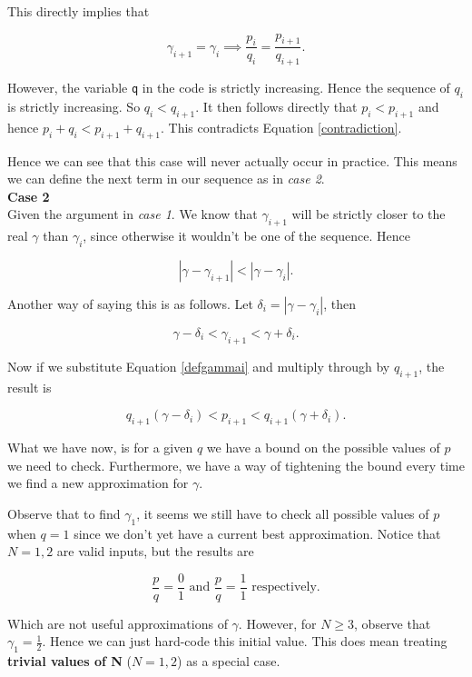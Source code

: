 \documentclass[10pt]{article}
\newcommand*{\gam}{$\gamma$}
\newcommand*{\gami}{$\gamma_{i}$}
\begin{document}
This directly implies that

$$ \gamma_{i+1} = \gamma_{i}  \implies \frac{p_i}{q_i} = \frac{p_{i+1}}{q_{i+1}}.$$

However, the variable \texttt{q} in the code is strictly increasing. Hence the sequence of $q_i$ is strictly increasing. So $q_i < q_{i+1}$. It then follows directly that $p_i < p_{i+1}$ and hence $p_i + q_i < p_{i+1} + q_{i+1}$. This contradicts Equation \ref{contradiction}.

Hence we can see that this case will never actually occur in practice. This means we can define the next term in our sequence as in \emph{case 2}. \\

\noindent \textbf{Case 2} \\

Given the argument in \emph{case 1}. We know that $\gamma_{i+1}$ will be strictly closer to the real $\gamma$ than \gami, since otherwise it wouldn't be one of the sequence. Hence

$$ |\gamma- \gamma_{i+1}| < |\gamma - \gamma_{i}| .$$

Another way of saying this is as follows. Let $\delta_{i} = | \gamma - \gamma_i  |$, then

$$ \gamma - \delta_i < \gamma_{i+1} < \gamma + \delta_i .$$

Now if we substitute Equation \ref{defgammai} and multiply through by $q_{i+1}$, the result is

\begin{equation} \label{em_constraint}
q_{i+1} (\gamma - \delta_i) < p_{i+1} < q_{i+1} ( \gamma + \delta_i ).
\end{equation} 

What we have now, is for a given $q$ we have a bound on the possible values of $p$ we need to check. Furthermore, we have a way of tightening the bound every time we find a new approximation for \gam.

Observe that to find $\gamma_1$, it seems we still have to check all possible values of $p$ when $q = 1$ since we don't yet have a current best approximation. Notice that $N = 1,2$ are valid inputs, but the results are

$$ \frac{p}{q} = \frac{0}{1} \text{  and  }  \frac{p}{q} = \frac{1}{ 1} \text{ respectively}. $$

Which are not useful approximations of \gam.
 However, for $N \geq 3$, observe that $\gamma_1 = \frac{1}{2}$. Hence we can just hard-code this initial value. This does mean treating \textbf{trivial values of N} ($N = 1,2$) as a special case.
\end{document}
